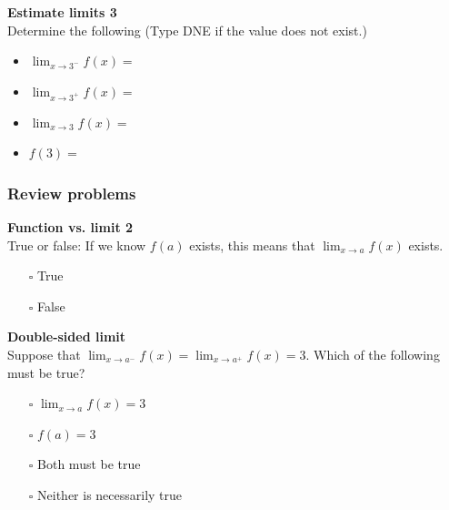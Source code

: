 \documentclass[pdftex, brazil, 12pt, twoside]{article}
\begin{document}
\begin{exercise}
  \textbf{Estimate limits 3}\\
  Determine the following (Type DNE if the value does
  not exist.)
  \begin{figure}[H]
    \begin{center}
    \end{center}
  \end{figure}
  \begin{itemize}
  \item $\displaystyle \lim_{x \to 3^{-}} f(x)=$
  \item $\displaystyle \lim_{x \to 3^{+}} f(x)=$
  \item $\displaystyle \lim_{x \to 3} f(x)=$
  \item $f(3)=$
  \end{itemize}
\end{exercise}

\subsubsection{Review problems}
\label{u0-intro-review}

\begin{exercise}
  \textbf{Function vs. limit 2}\\
  True or false: If we know $f(a)$ exists, this means
  that $\displaystyle \lim_{x \to a}f(x)$ exists.
  \begin{itemize}[noitemsep]
  \item[$\square$] True
  \item[$\square$] False
  \end{itemize}
\end{exercise}

\begin{exercise}
  \textbf{Double-sided limit}\\
  Suppose that $\displaystyle \lim_{x \to a^-}f(x) = \lim_{x \to a^+}f(x) = 3$. Which of the following must be true?
  \begin{itemize}[noitemsep]
  \item[$\square$] $\displaystyle \lim_{x \to a}f(x) = 3$
  \item[$\square$] $f(a) = 3$
  \item[$\square$] Both must be true
  \item[$\square$] Neither is necessarily true
  \end{itemize}
\end{exercise}
\end{document}
